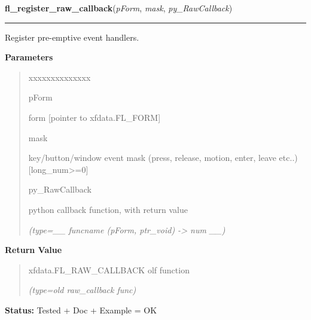 \hspace{.8\funcindent}\begin{boxedminipage}{\funcwidth}

    \raggedright \textbf{fl\_register\_raw\_callback}(\textit{pForm}, \textit{mask}, \textit{py\_RawCallback})

    \vspace{-1.5ex}

    \rule{\textwidth}{0.5\fboxrule}
\setlength{\parskip}{2ex}
    Register pre-emptive event handlers.

\setlength{\parskip}{1ex}
      \textbf{Parameters}
      \vspace{-1ex}

      \begin{quote}
        \begin{Ventry}{xxxxxxxxxxxxxx}

          \item[pForm]

          form [pointer to xfdata.FL\_FORM]

          \item[mask]

          key/button/window event mask (press, release, motion, enter, 
          leave etc..) [long\_num{\textgreater}=0]

          \item[py\_RawCallback]

          python callback function, with return value

            {\it (type=\_\_ funcname (pForm, ptr\_void) -{\textgreater} num \_\_)}

        \end{Ventry}

      \end{quote}

      \textbf{Return Value}
    \vspace{-1ex}

      \begin{quote}
      xfdata.FL\_RAW\_CALLBACK olf function

      {\it (type=old raw\_callback func)}

      \end{quote}

\textbf{Status:} Tested + Doc + Example = OK



    \end{boxedminipage}

    \label{xformslib:library:fl_register_raw_callback}

